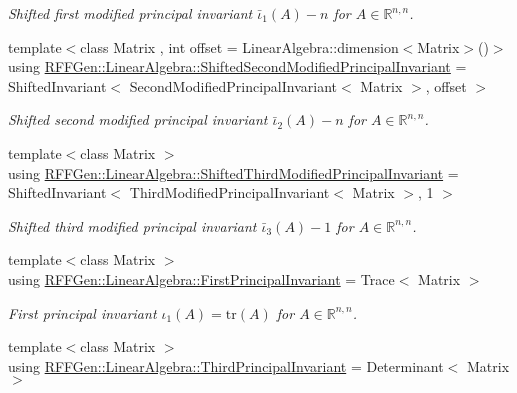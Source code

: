 \begin{DoxyCompactItemize}
\begin{DoxyCompactList}\small\item\em Shifted first modified principal invariant $ \bar\iota_1(A) - n $ for $ A\in\mathbb{R}^{n,n} $. \end{DoxyCompactList}\item 
\hypertarget{group__LinearAlgebraGroup_ga8d736a3e8713fe3445b04dd4ead07788}{{\footnotesize template$<$class Matrix , int offset = Linear\-Algebra\-::dimension$<$\-Matrix$>$()$>$ }\\using \hyperlink{group__LinearAlgebraGroup_ga8d736a3e8713fe3445b04dd4ead07788}{R\-F\-F\-Gen\-::\-Linear\-Algebra\-::\-Shifted\-Second\-Modified\-Principal\-Invariant} = Shifted\-Invariant$<$ Second\-Modified\-Principal\-Invariant$<$ Matrix $>$, offset $>$}\label{group__LinearAlgebraGroup_ga8d736a3e8713fe3445b04dd4ead07788}

\begin{DoxyCompactList}\small\item\em Shifted second modified principal invariant $ \bar\iota_2(A) - n $ for $ A\in\mathbb{R}^{n,n} $. \end{DoxyCompactList}\item 
\hypertarget{group__LinearAlgebraGroup_ga915154ab519db597193b2dcdf2e0368c}{{\footnotesize template$<$class Matrix $>$ }\\using \hyperlink{group__LinearAlgebraGroup_ga915154ab519db597193b2dcdf2e0368c}{R\-F\-F\-Gen\-::\-Linear\-Algebra\-::\-Shifted\-Third\-Modified\-Principal\-Invariant} = Shifted\-Invariant$<$ Third\-Modified\-Principal\-Invariant$<$ Matrix $>$, 1 $>$}\label{group__LinearAlgebraGroup_ga915154ab519db597193b2dcdf2e0368c}

\begin{DoxyCompactList}\small\item\em Shifted third modified principal invariant $ \bar\iota_3(A) - 1 $ for $ A\in\mathbb{R}^{n,n} $. \end{DoxyCompactList}\item 
\hypertarget{group__LinearAlgebraGroup_ga00013718baca174259e8699c7a5d9dc4}{{\footnotesize template$<$class Matrix $>$ }\\using \hyperlink{group__LinearAlgebraGroup_ga00013718baca174259e8699c7a5d9dc4}{R\-F\-F\-Gen\-::\-Linear\-Algebra\-::\-First\-Principal\-Invariant} = Trace$<$ Matrix $>$}\label{group__LinearAlgebraGroup_ga00013718baca174259e8699c7a5d9dc4}

\begin{DoxyCompactList}\small\item\em First principal invariant $ \iota_1(A)=\mathrm{tr}(A) $ for $A\in\mathbb{R}^{n,n}$. \end{DoxyCompactList}\item 
\hypertarget{group__LinearAlgebraGroup_ga3ace6e6d227a8bcaec150749f56e4886}{{\footnotesize template$<$class Matrix $>$ }\\using \hyperlink{group__LinearAlgebraGroup_ga3ace6e6d227a8bcaec150749f56e4886}{R\-F\-F\-Gen\-::\-Linear\-Algebra\-::\-Third\-Principal\-Invariant} = Determinant$<$ Matrix $>$}\label{group__LinearAlgebraGroup_ga3ace6e6d227a8bcaec150749f56e4886}


\end{DoxyCompactItemize}
